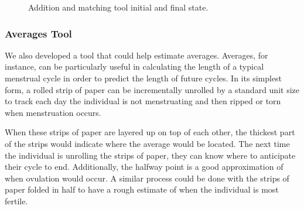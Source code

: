 \documentclass{sig-alternate}
\begin{document}
\begin{figure}%
    \centering
    \qquad
    \caption{Addition and matching tool initial and final state.}%
    \label{fig:add}%
\end{figure}

\subsubsection{Averages Tool}

We also developed a tool that could help estimate averages. Averages, for instance, can be particularly useful in calculating the length of a typical menstrual cycle in order to predict the length of future cycles. In its simplest form, a rolled strip of paper can be incrementally unrolled by a standard unit size to track each day the individual is not menstruating and then ripped or torn when menstruation occurs. 

When these strips of paper are layered up on top of each other, the thickest part of the strips would indicate where the average would be located. The next time the individual is unrolling the strips of paper, they can know where to anticipate their cycle to end. Additionally, the halfway point is a good approximation of when ovulation would occur. A similar process could be done with the strips of paper folded in half to have a rough estimate of when the individual is most fertile. 
\end{document}
